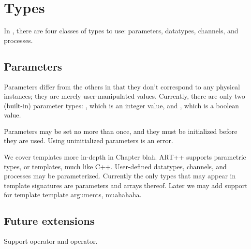 
\chapter{Types}
\label{sec:types}

In \artxx, there are four classes of types to use:
parameters, datatypes, channels, and processes.  

\section{Parameters}
\label{sec:parameters}

Parameters differ from the others in that they don't correspond
to any physical instances; they are merely user-manipulated values.  
Currently, there are only two (built-in) parameter types: 
\pint, which is an integer value,
and \pbool, which is a boolean value.  

Parameters may be set no more than once, and they must be 
initialized before they are used.  
Using uninitialized parameters is an error.  


We cover templates more in-depth in Chapter blah.  
ART++ supports parametric types, or templates, much like C++. 
User-defined datatypes, channels, and processes may be parameterized.  
Currently the only types that may appear in template signatures
are parameters and arrays thereof.  
Later we may add support for template template arguments, muahahaha.  

\section{Future extensions}
\label{sec:types:future}

Support  operator and  operator.  


